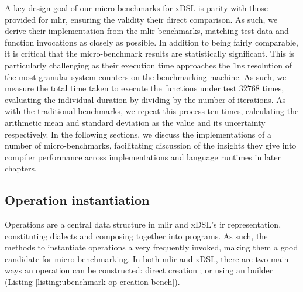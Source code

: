 A key design goal of our micro-benchmarks for xDSL is parity with those provided for \ac{mlir}, ensuring the validity their direct comparison.
As such, we derive their implementation from the \ac{mlir} benchmarks, matching test data and function invocations as closely as possible.
In addition to being fairly comparable, it is critical that the micro-benchmark results are statistically significant. This is particularly challenging as their execution time approaches the $1$ns resolution of the most granular system counters on the benchmarking machine. As such, we measure the total time taken to execute the functions under test $32768$ times, evaluating the individual duration by dividing by the number of iterations. As with the traditional benchmarks, we repeat this process ten times, calculating the arithmetic mean and standard deviation as the value and its uncertainty respectively.
In the following sections, we discuss the implementations of a number of micro-benchmarks, facilitating discussion of the insights they give into compiler performance across implementations and language runtimes in later chapters.


\subsection{Operation instantiation}
\label{ssec:ubenchmark-operation-instantiation}

Operations are a central data structure in \ac{mlir} and xDSL's \ac{ir} representation, constituting dialects and composing together into programs.
As such, the methods to instantiate operations a very frequently invoked, making them a good candidate for micro-benchmarking.
In both \ac{mlir} and xDSL, there are two main ways an operation can be constructed: direct creation ; or using an builder  (Listing \ref{listing:ubenchmark-op-creation-bench}).

